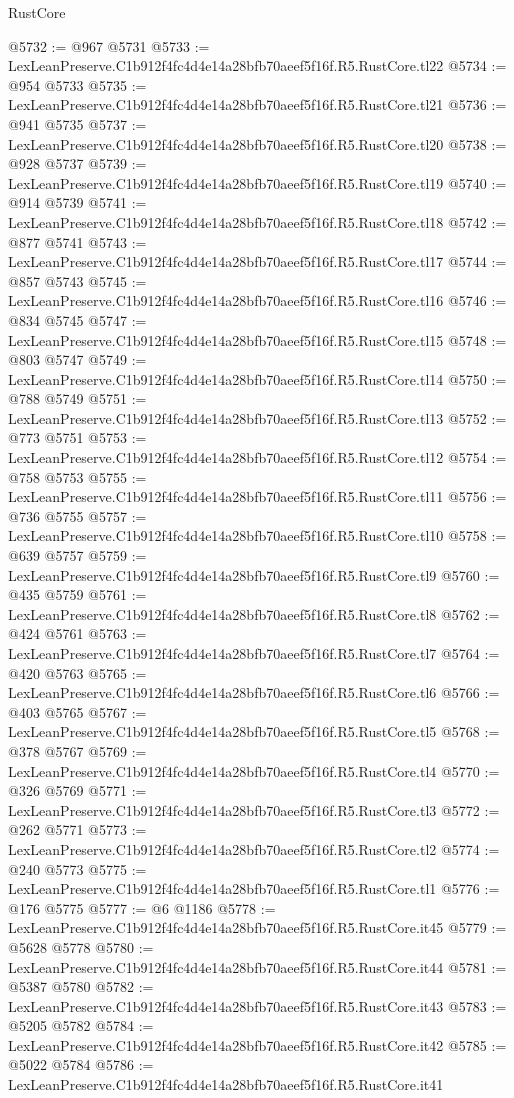 \begin{lexlean}{RustCore}
\begin{coremodule}
@5732 := @967 @5731
@5733 := LexLeanPreserve.C1b912f4fc4d4e14a28bfb70aeef5f16f.R5.RustCore.tl22
@5734 := @954 @5733
@5735 := LexLeanPreserve.C1b912f4fc4d4e14a28bfb70aeef5f16f.R5.RustCore.tl21
@5736 := @941 @5735
@5737 := LexLeanPreserve.C1b912f4fc4d4e14a28bfb70aeef5f16f.R5.RustCore.tl20
@5738 := @928 @5737
@5739 := LexLeanPreserve.C1b912f4fc4d4e14a28bfb70aeef5f16f.R5.RustCore.tl19
@5740 := @914 @5739
@5741 := LexLeanPreserve.C1b912f4fc4d4e14a28bfb70aeef5f16f.R5.RustCore.tl18
@5742 := @877 @5741
@5743 := LexLeanPreserve.C1b912f4fc4d4e14a28bfb70aeef5f16f.R5.RustCore.tl17
@5744 := @857 @5743
@5745 := LexLeanPreserve.C1b912f4fc4d4e14a28bfb70aeef5f16f.R5.RustCore.tl16
@5746 := @834 @5745
@5747 := LexLeanPreserve.C1b912f4fc4d4e14a28bfb70aeef5f16f.R5.RustCore.tl15
@5748 := @803 @5747
@5749 := LexLeanPreserve.C1b912f4fc4d4e14a28bfb70aeef5f16f.R5.RustCore.tl14
@5750 := @788 @5749
@5751 := LexLeanPreserve.C1b912f4fc4d4e14a28bfb70aeef5f16f.R5.RustCore.tl13
@5752 := @773 @5751
@5753 := LexLeanPreserve.C1b912f4fc4d4e14a28bfb70aeef5f16f.R5.RustCore.tl12
@5754 := @758 @5753
@5755 := LexLeanPreserve.C1b912f4fc4d4e14a28bfb70aeef5f16f.R5.RustCore.tl11
@5756 := @736 @5755
@5757 := LexLeanPreserve.C1b912f4fc4d4e14a28bfb70aeef5f16f.R5.RustCore.tl10
@5758 := @639 @5757
@5759 := LexLeanPreserve.C1b912f4fc4d4e14a28bfb70aeef5f16f.R5.RustCore.tl9
@5760 := @435 @5759
@5761 := LexLeanPreserve.C1b912f4fc4d4e14a28bfb70aeef5f16f.R5.RustCore.tl8
@5762 := @424 @5761
@5763 := LexLeanPreserve.C1b912f4fc4d4e14a28bfb70aeef5f16f.R5.RustCore.tl7
@5764 := @420 @5763
@5765 := LexLeanPreserve.C1b912f4fc4d4e14a28bfb70aeef5f16f.R5.RustCore.tl6
@5766 := @403 @5765
@5767 := LexLeanPreserve.C1b912f4fc4d4e14a28bfb70aeef5f16f.R5.RustCore.tl5
@5768 := @378 @5767
@5769 := LexLeanPreserve.C1b912f4fc4d4e14a28bfb70aeef5f16f.R5.RustCore.tl4
@5770 := @326 @5769
@5771 := LexLeanPreserve.C1b912f4fc4d4e14a28bfb70aeef5f16f.R5.RustCore.tl3
@5772 := @262 @5771
@5773 := LexLeanPreserve.C1b912f4fc4d4e14a28bfb70aeef5f16f.R5.RustCore.tl2
@5774 := @240 @5773
@5775 := LexLeanPreserve.C1b912f4fc4d4e14a28bfb70aeef5f16f.R5.RustCore.tl1
@5776 := @176 @5775
@5777 := @6 @1186
@5778 := LexLeanPreserve.C1b912f4fc4d4e14a28bfb70aeef5f16f.R5.RustCore.it45
@5779 := @5628 @5778
@5780 := LexLeanPreserve.C1b912f4fc4d4e14a28bfb70aeef5f16f.R5.RustCore.it44
@5781 := @5387 @5780
@5782 := LexLeanPreserve.C1b912f4fc4d4e14a28bfb70aeef5f16f.R5.RustCore.it43
@5783 := @5205 @5782
@5784 := LexLeanPreserve.C1b912f4fc4d4e14a28bfb70aeef5f16f.R5.RustCore.it42
@5785 := @5022 @5784
@5786 := LexLeanPreserve.C1b912f4fc4d4e14a28bfb70aeef5f16f.R5.RustCore.it41

\end{coremodule}
\end{lexlean}
